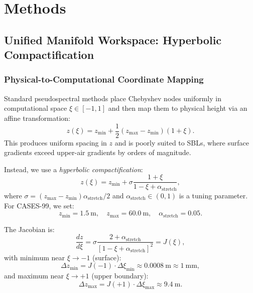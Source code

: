 \documentclass[11pt,a4paper]{article}
\begin{document}
\section{Methods}
\label{sec:methods}

\subsection{Unified Manifold Workspace: Hyperbolic Compactification}
\label{sec:methods:manifold}

\subsubsection{Physical-to-Computational Coordinate Mapping}

Standard pseudospectral methods place Chebyshev nodes uniformly in computational space $\xi \in [-1, 1]$ and then map them to physical height via an affine transformation:
\begin{equation}
z(\xi) = z_{\mathrm{min}} + \frac{1}{2}(z_{\mathrm{max}} - z_{\mathrm{min}})(1 + \xi).
\end{equation}
This produces uniform spacing in $z$ and is poorly suited to SBLs, where surface gradients exceed upper-air gradients by orders of magnitude.

Instead, we use a \emph{hyperbolic compactification}:
\begin{equation}
z(\xi) = z_{\mathrm{min}} + \sigma \frac{1 + \xi}{1 - \xi + \alpha_{\mathrm{stretch}}},
\label{eq:hyperbolic}
\end{equation}
where $\sigma = (z_{\mathrm{max}} - z_{\mathrm{min}}) \alpha_{\mathrm{stretch}} / 2$ and $\alpha_{\mathrm{stretch}} \in (0, 1)$ is a tuning parameter. For CASES-99, we set:
\begin{equation}
z_{\mathrm{min}} = \SI{1.5}{\meter}, \quad z_{\mathrm{max}} = \SI{60.0}{\meter}, \quad \alpha_{\mathrm{stretch}} = 0.05.
\end{equation}

The Jacobian is:
\begin{equation}
\frac{dz}{d\xi} = \sigma \frac{2 + \alpha_{\mathrm{stretch}}}{[1 - \xi + \alpha_{\mathrm{stretch}}]^2} = J(\xi),
\label{eq:jacobian}
\end{equation}
with minimum near $\xi \to -1$ (surface):
\begin{equation}
\Delta z_{\min} = J(-1) \cdot \Delta \xi_{\min} \approx \SI{0.0008}{\meter} \approx \SI{1}{\milli\meter},
\end{equation}
and maximum near $\xi \to +1$ (upper boundary):
\begin{equation}
\Delta z_{\max} = J(+1) \cdot \Delta \xi_{\max} \approx \SI{9.4}{\meter}.
\end{equation}
\end{document}
